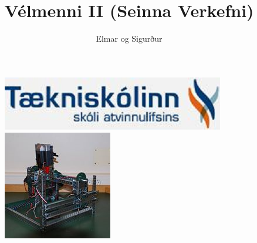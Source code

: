 \documentclass{article}
\begin{document}
\title{Vélmenni II (Seinna Verkefni)}
\author{Elmar og Sigurður}
\maketitle
\begin{figure}[h]
\centering
\includegraphics[scale=.65]{img/tskoli}
\includegraphics[scale=1]{img/rob2b3u_img}
\end{figure}
\newpage
\tableofcontents
\newpage






\newpage
\end{document}
